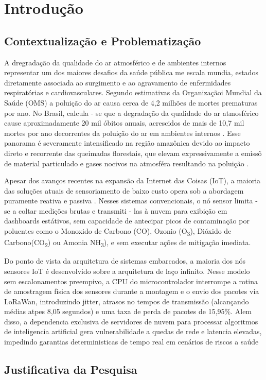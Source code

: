 \chapter{Introdução}
\section{Contextualização e Problematização}
A dregradação da qualidade do ar atmosférico e de ambientes 
internos representar um dos maiores desafios da saúde pública me
escala mundia, estados diretamente associada ao surgimento e ao 
agravamento de enfermidades respiratórias e cardiovasculares.
Segundo estimativas da Organizaçãoi Mundial da Saúde (OMS) a poluição do ar causa
cerca de 4,2 milhões de mortes prematuras por ano. No Brasil, calcula - se
que a degradação da qualidade do ar atmosférico cause aproximadamente 20 mil óbitos
anuais, acrescidos de mais de 10,7 mil mortes por ano decorrentes da poluição do ar
em ambientes internos \cite{cunha2024}. Esse panorama é severamente intensificado
na região amazônica devido ao impacto direto e recorrente das queimadas florestais,
que elevam expressivamente a emissõ de material particulado e gases nocivos na
atmosféra resultando na poluição \cite{gomes2024}.


Apesar dos avanços recentes na expansão da Internet das Coisas (IoT), a maioria
das soluções atuais de sensoriamento de baixo custo opera sob a abordagem puramente reativa 
e passiva \cite{cunha2024}. Nesses sistemas convencionais, o nó sensor limita - se a coltar
medições brutas e transmiti - las à nuvem para exibição em dashboards estátivos, sem capacidade
de antecipar picos de contaminação por poluentes como o Monoxido de Carbono (CO),
Ozonio (O\textsubscript{3}), Dióxido de Carbono(CO\textsubscript{2}) ou Amonia NH\textsubscript{3}), e 
sem executar ações de mitigação imediata. \cite{cunha2024}

Do ponto de vista da arquitetura de sistemas embarcados, a maioria dos nós sensores IoT
é desenvolvido sobre a arquitetura de laço infinito. Nesse modelo
sem escalonamentos preempivo, a CPU do microcontrolador interrompe a rotina de amostragem
física dos sensores durante a montagem e o envio dos pacotes via LoRaWan, introduzindo
jitter, atrasos no tempos de transmissão (alcançando médias atpes 8,05 segundos) e uma taxa
de perda de pacotes de 15,95\%. Alem disso, a dependencia exclusiva de servidores
de nuvem para processar algoritmos de inteligencia artificial gera vulnerabilidade a quedas 
de rede e latencia elevadas, impedindo garantias deterministicas de tempo real em cenários
de riscos a saúde \cite{alves2025freertos}

\section{Justificativa da Pesquisa}